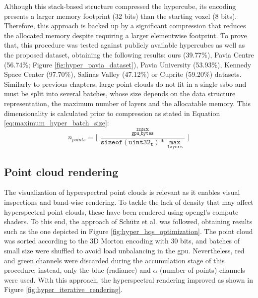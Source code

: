 Although this stack-based structure compressed the hypercube, its encoding presents a larger memory footprint (32 bits) than the starting voxel (8 bits). Therefore, this approach is backed up by a significant compression that reduces the allocated memory despite requiring a larger elementwise footprint. To prove that, this procedure was tested against publicly available hypercubes \cite{noauthor_hyperspectral_nodate} as well as the proposed dataset, obtaining the following results: ours (39.77\%), Pavia Centre (56.74\%; Figure \ref{fig:hyper_pavia_dataset}), Pavia University (53.93\%), Kennedy Space Center (97.70\%), Salinas Valley (47.12\%) or Cuprite (59.20\%) datasets. Similarly to previous chapters, large point clouds do not fit in a single \acrshort{ssbo} and must be split into several batches, whose size depends on the data structure representation, the maximum number of layers and the allocatable memory. This dimensionality is calculated prior to compression as stated in Equation \ref{eq:maximum_hyper_batch_size}:
\begin{equation}
    n_{\textit{points}} = \lfloor{\frac{\max_{\mathtt{gpu\_bytes}}}{\mathtt{sizeof(uint32_t)} * \mathtt{\max_{\mathtt{layers}}}}\rfloor}
    \label{eq:maximum_hyper_batch_size}
\end{equation}

\subsection{Point cloud rendering}

The visualization of hyperspectral point clouds is relevant as it enables visual inspections and band-wise rendering. To tackle the lack of density that may affect hyperspectral point clouds, these have been rendered using \acrshort{opengl}'s compute shaders. To this end, the approach of Schütz et al. \cite{schutz_rendering_2021} was followed, obtaining results such as the one depicted in Figure \ref{fig:hyper_hqs_optimization}. The point cloud was sorted according to the 3D Morton encoding with 30 bits, and batches of small size were shuffled to avoid load unbalancing in the \acrshort{gpu}. Nevertheless, red and green channels were discarded during the accumulation stage of this procedure; instead, only the blue (radiance) and $\alpha$ (number of points) channels were used. With this approach, the hyperspectral rendering improved as shown in Figure \ref{fig:hyper_iterative_rendering}.

